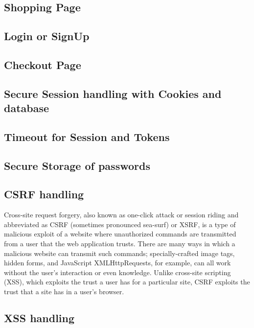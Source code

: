 \documentclass[12pt,a4paper]{article}
\begin{document}
\begin{flushleft}
	\subsection {Shopping Page}
	\subsection {Login or SignUp}
	\subsection {Checkout Page}
	
	\subsection{Secure Session handling with Cookies and database}
	
	\subsection{Timeout for Session and Tokens}
	
	\subsection{Secure Storage of passwords}
	
	\subsection{CSRF handling}
	
	\begin{flushleft}
		Cross-site request forgery, also known as one-click attack or session riding and abbreviated as CSRF (sometimes pronounced sea-surf) or XSRF, is a type of malicious exploit of a website where unauthorized commands are transmitted from a user that the web application trusts. There are many ways in which a malicious website can transmit such commands; specially-crafted image tags, hidden forms, and JavaScript XMLHttpRequests, for example, can all work without the user's interaction or even knowledge. Unlike cross-site scripting (XSS), which exploits the trust a user has for a particular site, CSRF exploits the trust that a site has in a user's browser.
	\end{flushleft}
	
	\subsection{XSS handling}
	

\end{flushleft}
\end{document}
